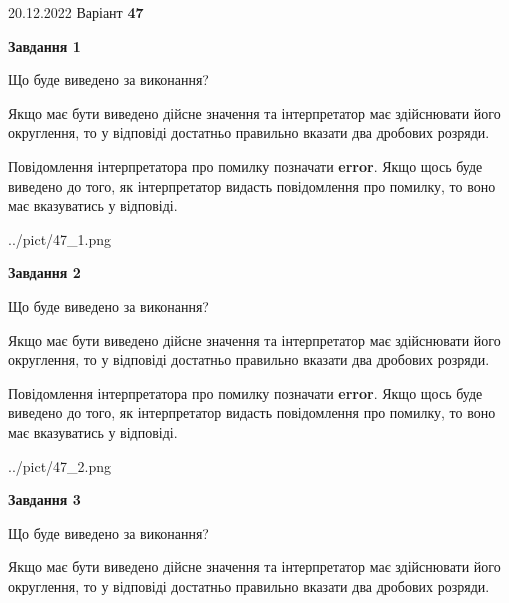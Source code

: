\documentclass[12pt, ukrainian]{article}
\begin{document}
{20.12.2022 Варіант \No \textbf { 47 }\par}
{
\begin {Large}

{\begin {center}\textbf{Завдання 1}\end {center}}\par
Що буде виведено за виконання? \par

Якщо має бути виведено дійсне значення та інтерпретатор має здійснювати його округлення, 
то у відповіді достатньо правильно вказати два дробових розряди.

Повідомлення інтерпретатора про помилку позначати \textbf{error}.
Якщо щось буде виведено до того, як інтерпретатор видасть повідомлення про помилку, 
то воно має вказуватись у відповіді. \par

\begin{center}
	{../pict/47_1.png}
\end{center}
\newpage

{\begin {center}\textbf{Завдання 2}\end {center}}\par
Що буде виведено за виконання? \par

Якщо має бути виведено дійсне значення та інтерпретатор має здійснювати його округлення, 
то у відповіді достатньо правильно вказати два дробових розряди.

Повідомлення інтерпретатора про помилку позначати \textbf{error}.
Якщо щось буде виведено до того, як інтерпретатор видасть повідомлення про помилку, 
то воно має вказуватись у відповіді. \par

\begin{center}
	{../pict/47_2.png}
\end{center}
\newpage

{\begin {center}\textbf{Завдання 3}\end {center}}\par
Що буде виведено за виконання? \par

Якщо має бути виведено дійсне значення та інтерпретатор має здійснювати його округлення, 
то у відповіді достатньо правильно вказати два дробових розряди.


\end{Large}}
\end{document}
